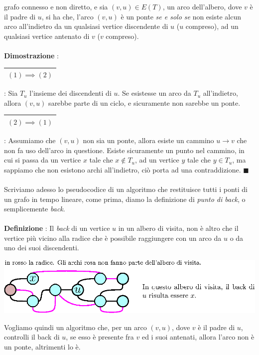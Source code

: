 \documentclass[12pt, letterpaper]{article}
\newcommand{\acc}{\\\hphantom{}\\}
\newcommand{\boxedMath}[1]{\begin{tabular}{|c|}\hline \texttt{#1} \\ \hline\end{tabular} :}
\begin{document}
grafo connesso e non diretto, e sia $(v,u)\in E(T)$, un arco dell'albero, dove $v$ è il padre di $u$, si ha che,
l'arco  $(v,u)$ è un ponte \textit{se e solo se} non esiste alcun arco all'indietro da un qualsiasi vertice
discendente di $u$ ($u$ compreso), ad un qualsiasi vertice antenato di $v$ ($v$ compreso).\acc
\textbf{Dimostrazione} : \boxedMath{$(1)\implies(2)$} Sia $T_u$ l'insieme dei discendenti di $u$. Se esistesse un arco da  $T_u$ all'indietro,
allora $(v,u)$ sarebbe parte di un ciclo, e sicuramente non sarebbe un ponte. \boxedMath{$(2)\implies(1)$} Assumiamo che
$(v,u)$ non sia un ponte, allora esiste un cammino $u\rightarrow v$ che non fa uso dell'arco in questione. Esiste sicuramente
un punto nel cammino, in cui si passa da un vertice $x$ tale che $x\notin T_u$, ad un vertice $y$ tale che
$y\in T_u$, ma sappiamo che non esistono archi all'indietro, ciò porta ad una contraddizione. $\blacksquare$\acc
Scriviamo adesso lo pseudocodice di un algoritmo che restituisce tutti i ponti di un grafo in tempo lineare, come prima, diamo
la definizione di \textit{punto di back}, o semplicemente \textit{back}.\acc
\textbf{Definizione} : Il \textit{back} di un vertice $u$ in un albero di visita, non è altro che il vertice più
vicino alla radice che è possibile raggiungere con un arco da $u$ o da uno dei suoi discendenti.\begin{center}
    \includegraphics[width=1\textwidth ]{images/back.eps}
\end{center}
Vogliamo quindi un algoritmo che, per un arco $(v,u)$, dove $v$ è il padre di $u$,  controlli il
back di $u$, se esso è presente fra $v$ ed i suoi antenati, allora l'arco non è un ponte, altrimenti lo è.
\end{document}
